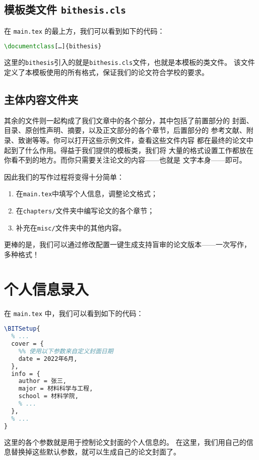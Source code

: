 \subsection{模板类文件 \texttt{bithesis.cls}}

在 \texttt{main.tex} 的最上方，我们可以看到如下的代码：
\begin{lstlisting}[language=TeX]
\documentclass[…]{bithesis}
\end{lstlisting}
这里的\texttt{bithesis}引入的就是\texttt{bithesis.cls}文件，也就是本模板的类文件。
该文件定义了本模板使用的所有格式，保证我们的论文符合学校的要求。

\subsection{主体内容文件夹}

其余的文件则一起构成了我们文章中的各个部分，其中包括了前置部分的
封面、目录、原创性声明、摘要，以及正文部分的各个章节，后置部分的
参考文献、附录、致谢等等。你可以打开这些示例文件，查看这些文件内容
都在最终的论文中起到了什么作用。得益于我们提供的模板类，我们将
大量的格式设置工作都放在你看不到的地方。而你只需要关注论文的内容——也就是
文字本身——即可。

因此我们的写作过程将变得十分简单：
\begin{enumerate}
  \item 在\texttt{main.tex}中填写个人信息，调整论文格式；
  \item 在\texttt{chapters/}文件夹中编写论文的各个章节；
  \item 补充在\texttt{misc/}文件夹中的其他内容。
\end{enumerate}

更棒的是，我们可以通过修改配置一键生成支持盲审的论文版本——一次写作，
多种格式！

\section{个人信息录入}

在 \texttt{main.tex} 中，我们可以看到如下的代码：
\begin{lstlisting}[language=TeX]
\BITSetup{
  % ...
  cover = {
    %% 使用以下参数来自定义封面日期
    date = 2022年6月,
  },
  info = {
    author = 张三,
    major = 材料科学与工程,
    school = 材料学院,
    % ...
  },
  % ...
}
\end{lstlisting}

这里的各个参数就是用于控制论文封面的个人信息的。
在这里，我们用自己的信息替换掉这些默认参数，就可以生成自己的论文封面了。

